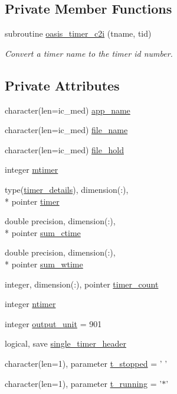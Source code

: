 \subsection*{Private Member Functions}
\begin{DoxyCompactItemize}
\item 
subroutine \hyperlink{classmod__oasis__timer_a23df8ae4894ac3fde178fe17292b317b}{oasis\+\_\+timer\+\_\+c2i} (tname, tid)
\begin{DoxyCompactList}\small\item\em Convert a timer name to the timer id number. \end{DoxyCompactList}\end{DoxyCompactItemize}
\subsection*{Private Attributes}
\begin{DoxyCompactItemize}
\item 
character(len=ic\+\_\+med) \hyperlink{classmod__oasis__timer_ad73dfe7213bbfab6212b9617000f4ce3}{app\+\_\+name}
\item 
character(len=ic\+\_\+med) \hyperlink{classmod__oasis__timer_a12dc3f95f8178d2ea46037a33da0e823}{file\+\_\+name}
\item 
character(len=ic\+\_\+med) \hyperlink{classmod__oasis__timer_a25a9f5f978c475475b48d782c4ad279c}{file\+\_\+hold}
\item 
integer \hyperlink{classmod__oasis__timer_acb04b78110e512ad551f7a500af70ef7}{mtimer}
\item 
type(\hyperlink{structmod__oasis__timer_1_1timer__details}{timer\+\_\+details}), dimension(\+:), \\*
pointer \hyperlink{classmod__oasis__timer_a8a4b64983bdf68b795ab2112bc02b8bc}{timer}
\item 
double precision, dimension(\+:), \\*
pointer \hyperlink{classmod__oasis__timer_a88e3c8171551da0ee64d10270484f6bf}{sum\+\_\+ctime}
\item 
double precision, dimension(\+:), \\*
pointer \hyperlink{classmod__oasis__timer_ab4d27b8be5c21939ab8d8e32d5582e9e}{sum\+\_\+wtime}
\item 
integer, dimension(\+:), pointer \hyperlink{classmod__oasis__timer_a225db1b2b8bd57f0567d37b5c4d00ca3}{timer\+\_\+count}
\item 
integer \hyperlink{classmod__oasis__timer_aa92116f5ed11fd498b11b37e368e7b72}{ntimer}
\item 
integer \hyperlink{classmod__oasis__timer_a80e0bc610eb9e9b0aa07e926d5a9fde8}{output\+\_\+unit} = 901
\item 
logical, save \hyperlink{classmod__oasis__timer_a3733877ab9fa9d07df0ff70f21cd08b0}{single\+\_\+timer\+\_\+header}
\item 
character(len=1), parameter \hyperlink{classmod__oasis__timer_aceca66a08f073eb12f2643edc7c400fe}{t\+\_\+stopped} = ' '
\item 
character(len=1), parameter \hyperlink{classmod__oasis__timer_a110185cdca99e2889419692182b0440a}{t\+\_\+running} = '$\ast$'
\end{DoxyCompactItemize}


